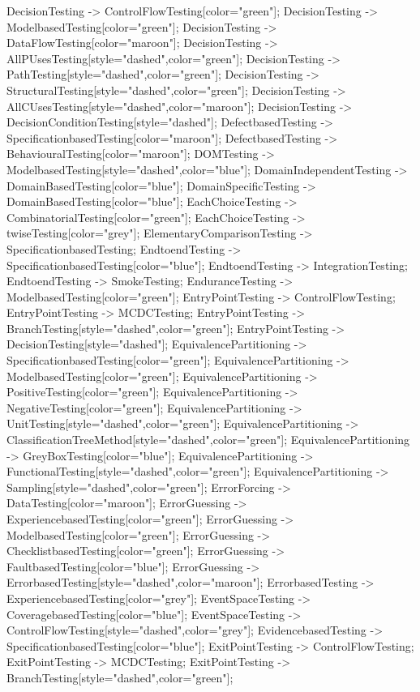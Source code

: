 \documentclass{article}
\begin{document}
{DecisionTesting -> ControlFlowTesting[color="green"];
DecisionTesting -> ModelbasedTesting[color="green"];
DecisionTesting -> DataFlowTesting[color="maroon"];
DecisionTesting -> AllPUsesTesting[style="dashed",color="green"];
DecisionTesting -> PathTesting[style="dashed",color="green"];
DecisionTesting -> StructuralTesting[style="dashed",color="green"];
DecisionTesting -> AllCUsesTesting[style="dashed",color="maroon"];
DecisionTesting -> DecisionConditionTesting[style="dashed"];
DefectbasedTesting -> SpecificationbasedTesting[color="maroon"];
DefectbasedTesting -> BehaviouralTesting[color="maroon"];
DOMTesting -> ModelbasedTesting[style="dashed",color="blue"];
DomainIndependentTesting -> DomainBasedTesting[color="blue"];
DomainSpecificTesting -> DomainBasedTesting[color="blue"];
EachChoiceTesting -> CombinatorialTesting[color="green"];
EachChoiceTesting -> twiseTesting[color="grey"];
ElementaryComparisonTesting -> SpecificationbasedTesting;
EndtoendTesting -> SpecificationbasedTesting[color="blue"];
EndtoendTesting -> IntegrationTesting;
EndtoendTesting -> SmokeTesting;
EnduranceTesting -> ModelbasedTesting[color="green"];
EntryPointTesting -> ControlFlowTesting;
EntryPointTesting -> MCDCTesting;
EntryPointTesting -> BranchTesting[style="dashed",color="green"];
EntryPointTesting -> DecisionTesting[style="dashed"];
EquivalencePartitioning -> SpecificationbasedTesting[color="green"];
EquivalencePartitioning -> ModelbasedTesting[color="green"];
EquivalencePartitioning -> PositiveTesting[color="green"];
EquivalencePartitioning -> NegativeTesting[color="green"];
EquivalencePartitioning -> UnitTesting[style="dashed",color="green"];
EquivalencePartitioning -> ClassificationTreeMethod[style="dashed",color="green"];
EquivalencePartitioning -> GreyBoxTesting[color="blue"];
EquivalencePartitioning -> FunctionalTesting[style="dashed",color="green"];
EquivalencePartitioning -> Sampling[style="dashed",color="green"];
ErrorForcing -> DataTesting[color="maroon"];
ErrorGuessing -> ExperiencebasedTesting[color="green"];
ErrorGuessing -> ModelbasedTesting[color="green"];
ErrorGuessing -> ChecklistbasedTesting[color="green"];
ErrorGuessing -> FaultbasedTesting[color="blue"];
ErrorGuessing -> ErrorbasedTesting[style="dashed",color="maroon"];
ErrorbasedTesting -> ExperiencebasedTesting[color="grey"];
EventSpaceTesting -> CoveragebasedTesting[color="blue"];
EventSpaceTesting -> ControlFlowTesting[style="dashed",color="grey"];
EvidencebasedTesting -> SpecificationbasedTesting[color="blue"];
ExitPointTesting -> ControlFlowTesting;
ExitPointTesting -> MCDCTesting;
ExitPointTesting -> BranchTesting[style="dashed",color="green"];
}
\end{document}

